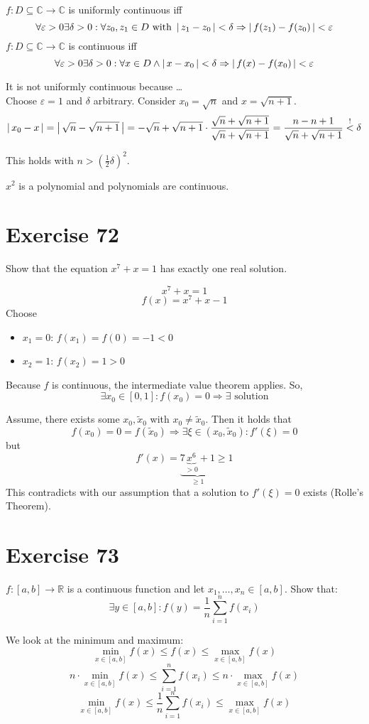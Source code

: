 \documentclass[a4paper]{article}
\theoremstyle{definition}
\newcommand\abs[1]{\left|\thinspace #1\thinspace\right|}
\begin{document}
$f: D \subseteq \mathbb C \to \mathbb C$ is uniformly continuous iff
\[
  \forall \varepsilon > 0 \exists \delta > 0:
  \forall z_0, z_1 \in D \text{ with } \abs{z_1 - z_0} < \delta
  \Rightarrow \abs{f(z_1) - f(z_0)} < \varepsilon
\]
$f: D \subseteq \mathbb C \to \mathbb C$ is continuous iff
\[
  \forall \varepsilon > 0 \exists \delta > 0: \forall x \in D
  \land \abs{x - x_0} < \delta \Rightarrow \abs{f(x) - f(x_0)} < \varepsilon
\]

It is not uniformly continuous because \dots \\
Choose $\varepsilon = 1$ and $\delta$ arbitrary.
Consider $x_0 = \sqrt{n}$ and $x = \sqrt{n + 1}$.
%
\[
  \abs{x_0 - x} = \abs{\sqrt{n} - \sqrt{n + 1}}
    = -\sqrt{n} + \sqrt{n + 1} \cdot \frac{\sqrt{n} + \sqrt{n+1}}{\sqrt{n} + \sqrt{n+1}}
    = \frac{n - n + 1}{\sqrt{n} + \sqrt{n + 1}}
    \overset{!}{<} \delta
\]

This holds with $n > \left(\frac12 \delta\right)^2$.

$x^2$ is a polynomial and polynomials are continuous.

\section{Exercise 72}
%
\begin{ex}
  Show that the equation $x^7 + x = 1$ has exactly one real solution.
\end{ex}
%
\[ x^7 + x = 1 \]
\[ f(x) = x^7 + x - 1 \]
%
Choose
\begin{itemize}
  \item $x_1 = 0$: $f(x_1) = f(0) = -1 < 0$
  \item $x_2 = 1$: $f(x_2) = 1 > 0$
\end{itemize}

Because $f$ is continuous, the intermediate value theorem applies. So,
\[ \exists x_0 \in [0,1]: f(x_0) = 0 \Rightarrow \exists \text{ solution} \]

Assume, there exists some $x_0, \tilde{x}_0$ with $x_0 \neq \tilde{x}_0$.
Then it holds that
\[ f(x_0) = 0 = f(\tilde{x}_0) \Rightarrow \exists \xi \in (x_0, \tilde{x}_0): f'(\xi) = 0 \]
but
\[ f'(x) = \underbrace{7\underbrace{x^6}_{>0} + 1}_{\geq 1} \geq 1 \]
This contradicts with our assumption that a solution to $f'(\xi) = 0$ exists (Rolle's Theorem).

\section{Exercise 73}
%
\begin{ex}
  $f: [a,b] \to \mathbb R$ is a continuous function and let $x_1, \ldots, x_n \in [a,b]$.
  Show that:
  \[ \exists y \in [a,b]: f(y) = \frac1n \sum_{i=1}^n f(x_i) \]
\end{ex}
%
We look at the minimum and maximum:
\[ \min_{x \in [a,b]} f(x) \leq f(x) \leq \max_{x \in [a,b]} f(x) \]
\[
  n \cdot \min_{x \in [a,b]} f(x) \leq \sum_{i=1}^n f(x_i) \leq n \cdot \max_{x \in [a,b]} f(x)
\] \[
  \min_{x \in [a,b]} f(x) \leq \frac1n \sum_{i=1}^n f(x_i) \leq \max_{x \in [a,b]} f(x)
\]
\end{document}
